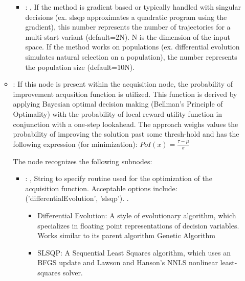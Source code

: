 \begin{itemize}
\begin{itemize}
\begin{itemize}
            \item {}: ,
              If the method is gradient based or typically handled with singular
              decisions (ex. slsqp approximates a quadratic program using the gradient), this number
              represents the number of trajectories for a multi-start variant (default=2N).
              N is the dimension of the input space.
              If the method works on populations (ex. differential evolution simulates
              natural selection on a population),
              the number represents the population size (default=10N).
          \end{itemize}

        \item {}:
          If this node is present within the acquisition node,                         the
          probability of improvement acqusition function is utilized.                         This
          function is derived by applying Bayesian optimal decision making (Bellman's Principle of
          Optimality)                         with the probability of local reward utility function
          in conjunction with a one-step lookahead.                         The approach weighs
          values the probability of improving the solution past some thresh-hold and has the
          following expression (for minimization):                         $PoI(x) = \frac{\tau -
          \mu}{\sigma}$

          The  node recognizes the following subnodes:
          \begin{itemize}
            \item {}: ,
              String to specify routine used for the optimization of the acquisition function.
              Acceptable options include: ('differentialEvolution', 'slsqp').
              .
              \begin{itemize}                                                  \item Differential
              Evolution: A style of evolutionary algorithm, which specializes in floating point
              representations of decision variables. Works similar to its parent algorithm Genetic
              Algorithm                                                  \item SLSQP: A Sequential
              Least Squares algorithm, which uses an BFGS update and
              Lawson and Hanson’s NNLS nonlinear least-squares solver.
              \end{itemize}


\end{itemize}
\end{itemize}
\end{itemize}
